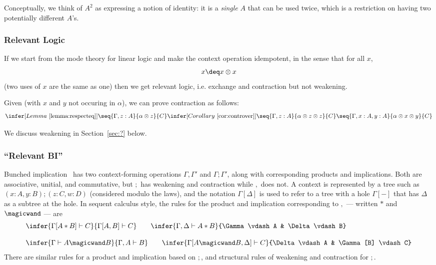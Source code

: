 Conceptually, we think of $A^2$ as expressing a notion of identity: it is
a \emph{single} $A$ that can be used twice, which is a restriction on
having two potentially different $A$'s.  

\subsubsection{Relevant Logic}

If we start from the mode theory for linear logic and make the context
operation idempotent, in the sense that for all $x$,
\[
x \deq x \otimes x 
\]
(two uses of $x$ are the same as one) then we get relevant logic,
i.e. exchange and contraction but not weakening.

Given (with $x$ and $y$ not occuring in $\alpha$), we can prove
contraction as follows:
\[
\infer[Lemma~\ref{lemma:respecteq}]
      {\seq{\Gamma,z:A}{\alpha \otimes z}{C}}
      {\infer[Corollary~\ref{cor:controver}]{\seq{\Gamma,z:A}{\alpha \otimes z \otimes z}{C}}
                                    {\seq{\Gamma,x:A,y:A}{\alpha \otimes x \otimes y}{C}}}
\]

We discuss weakening in Section~\ref{sec:?} below.  

\subsubsection{``Relevant BI''} Bunched implication~\citep{ohearnpym}
has two context-forming operations $\Gamma,\Gamma'$ and
$\Gamma;\Gamma'$, along with corresponding products and implications.
Both are associative, unitial, and commutative, but $;$ has weakening
and contraction while $,$ does not.  A context is represented by a tree
such as $(x:A, y:B);(z : C, w : D)$ (considered modulo the laws), and
the notation $\Gamma[\Delta]$ is used to refer to a tree with a hole
$\Gamma[-]$ that has $\Delta$ as a subtree at the hole.  In sequent
calculus style, the rules for the product and implication corresponding
to $,$ --- written $*$ and $\magicwand$ --- are
\[
\begin{array}{l}
\infer{\Gamma[A * B] \vdash C}
      {\Gamma[A , B] \vdash C}
\qquad
\infer{\Gamma,\Delta \vdash A * B}
      {\Gamma \vdash A &
       \Delta \vdash B}
\\ \\
\infer{\Gamma \vdash A \magicwand B}
      {\Gamma, A \vdash B}
\qquad
\infer{\Gamma[A \magicwand B, \Delta] \vdash C}
      {\Delta \vdash A &
       \Gamma[B] \vdash C}
\end{array}
\]
There are similar rules for a product and implication based on $;$, and 
structural rules of weakening and contraction for $;$.  

